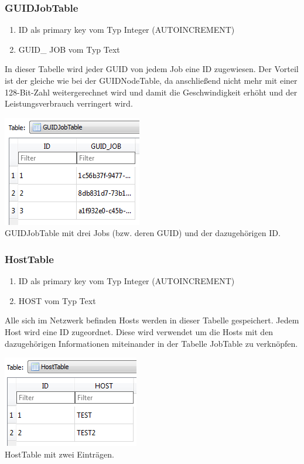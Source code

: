 \documentclass[12pt,a4paper]{report}
\begin{document}
\begin{onehalfspace}
\subsubsection{GUIDJobTable}
\begin{enumerate}
\item ID als primary key vom Typ Integer (AUTOINCREMENT)
\item GUID\_ JOB vom Typ Text
\end{enumerate}
In dieser Tabelle wird jeder GUID von jedem Job eine ID zugewiesen. Der Vorteil ist der gleiche wie bei der GUIDNodeTable, da anschließend nicht mehr mit einer 128-Bit-Zahl weitergerechnet wird und damit die Geschwindigkeit erhöht und der Leistungsverbrauch verringert wird.
\begin{center}
\includegraphics[scale=0.8]{img/db-tb-guid-job.png}\\
GUIDJobTable mit drei Jobs (bzw. deren GUID) und der dazugehörigen ID. 
\end{center}
\subsubsection{HostTable}
\begin{enumerate}
\item ID als primary key vom Typ Integer (AUTOINCREMENT)
\item HOST vom Typ Text
\end{enumerate}
Alle sich im Netzwerk befinden Hosts werden in dieser Tabelle gespeichert. Jedem Host wird eine ID zugeordnet. Diese wird verwendet um die Hosts mit den dazugehörigen Informationen miteinander in der Tabelle JobTable zu verknöpfen.
\begin{center}
\includegraphics[scale=0.8]{img/db-tb-host.png}\\
HostTable mit zwei Einträgen.
\end{center}

\end{onehalfspace}
\end{document}
